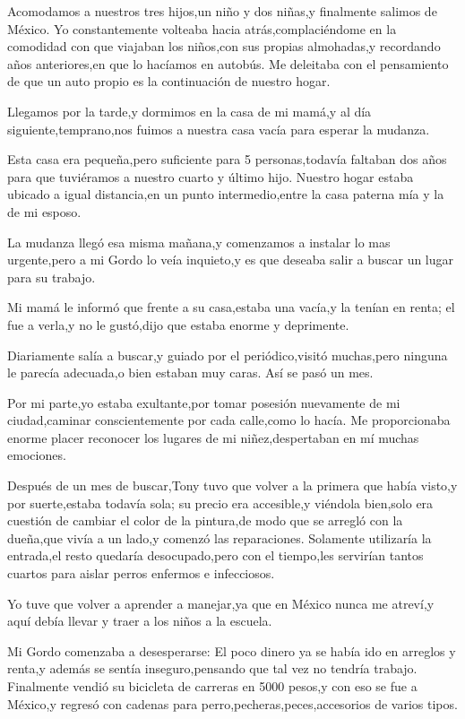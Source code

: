\documentclass[letterpaper,12pt]{book}
\begin{document}
Acomodamos a nuestros tres hijos,un niño y dos niñas,y finalmente salimos de México. Yo constantemente volteaba hacia atrás,complaciéndome en la comodidad con que viajaban los niños,con sus propias almohadas,y recordando años anteriores,en que lo hacíamos en autobús. Me deleitaba con el pensamiento de que un auto propio es la continuación de nuestro hogar.

Llegamos por la tarde,y dormimos en la casa de mi mamá,y al día siguiente,temprano,nos fuimos a nuestra casa vacía para esperar la mudanza.

Esta casa era pequeña,pero suficiente para 5 personas,todavía faltaban dos años para que tuviéramos a nuestro cuarto y último hijo. Nuestro hogar estaba ubicado a igual distancia,en un punto intermedio,entre la casa paterna mía y la de mi esposo.

La mudanza llegó esa misma mañana,y comenzamos a instalar lo mas urgente,pero a mi Gordo lo veía inquieto,y es que deseaba salir a buscar un lugar para su trabajo. 

Mi mamá le informó que frente a su casa,estaba una vacía,y la tenían en renta; el fue a verla,y no le gustó,dijo que estaba enorme y deprimente.

Diariamente salía a buscar,y guiado por el periódico,visitó muchas,pero ninguna le parecía adecuada,o bien estaban muy caras. Así se pasó un mes.

Por mi parte,yo estaba exultante,por tomar posesión nuevamente de mi ciudad,caminar conscientemente por cada calle,como lo hacía. Me proporcionaba enorme placer reconocer los lugares de mi niñez,despertaban en mí muchas emociones. 

Después de un mes de buscar,Tony tuvo que volver a la primera que había visto,y por suerte,estaba todavía sola; su precio era accesible,y viéndola bien,solo era cuestión de cambiar el color de la pintura,de modo que se arregló con la dueña,que vivía a un lado,y comenzó las reparaciones. Solamente utilizaría la entrada,el resto quedaría desocupado,pero con el tiempo,les servirían tantos cuartos para aislar perros enfermos e infecciosos. 

Yo tuve que volver a aprender a manejar,ya que en México nunca me atreví,y aquí debía llevar y traer a los niños a la escuela.

Mi Gordo comenzaba a desesperarse: El poco dinero ya se había ido en arreglos y renta,y además se sentía inseguro,pensando que tal vez no tendría trabajo. Finalmente vendió su bicicleta de carreras en 5000 pesos,y con eso se fue a México,y regresó con cadenas para perro,pecheras,peces,accesorios de varios tipos.
\end{document}
